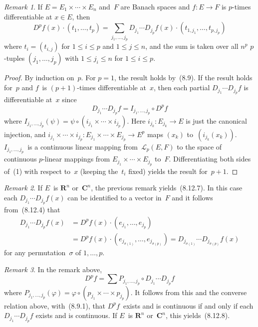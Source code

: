 \documentclass[letterpaper,12pt]{article}
\newcommand{\R}{\mathbf{R}}
\newcommand{\C}{\mathbf{C}}
\renewcommand{\L}{\mathcal{L}}
\newcommand{\after}{\circ}
\newcommand{\at}{\cdot}
\theoremstyle{plain}
\theoremstyle{definition}
\theoremstyle{remark}
\newtheorem*{rmk}{Remark}
\begin{document}
\begin{rmk}
If \(E=E_1\times\cdots\times E_n\) and~\(F\) are Banach spaces and \(f:E\to F\) is \(p\)-times differentiable at \(x\in E\), then
\[D^pf(x)\at(t_1,\ldots,t_p)=\sum_{j_1,\ldots,j_p}D_{j_1}\cdots D_{j_p}f(x)\at(t_{1,j_1},\ldots,t_{p,j_p})\tag{1}\]
where \(t_i=(t_{i,j})\) for \(1\le i\le p\) and \(1\le j\le n\), and the sum is taken over all \(n^p\) \(p\)-tuples \((j_1,\ldots,j_p)\) with \(1\le j_i\le n\) for \(1\le i\le p\).
\end{rmk}
\begin{proof}
By induction on~\(p\). For \(p=1\), the result holds by~(8.9). If the result holds for~\(p\) and \(f\)~is \((p+1)\)-times differentiable at~\(x\), then each partial \(D_{j_1}\cdots D_{j_p}f\) is differentiable at~\(x\) since
\[D_{j_1}\cdots D_{j_p}f=I_{j_1,\ldots,j_p}\after D^pf\]
where \(I_{j_1,\ldots,j_p}(\psi)=\psi\after(i_{j_1}\times\cdots\times i_{j_p})\). Here \(i_{j_k}:E_{j_k}\to E\) is just the canonical injection, and \(i_{j_1}\times\cdots\times i_{j_p}:E_{j_1}\times\cdots\times E_{j_p}\to E^p\) maps \((x_k)\) to~\((i_{j_k}(x_k))\). \(I_{j_1,\ldots,j_p}\)~is a continuous linear mapping from~\(\L_p(E,F)\) to the space of continuous \(p\)-linear mappings from \(E_{j_1}\times\cdots\times E_{j_p}\) to~\(F\). Differentiating both sides of~(1) with respect to~\(x\) (keeping the~\(t_i\) fixed) yields the result for~\(p+1\).
\end{proof}

\begin{rmk}
If \(E\)~is \(\R^n\) or~\(\C^n\), the previous remark yields~(8.12.7). In this case each \(D_{j_1}\cdots D_{j_p}f(x)\) can be identified to a vector in~\(F\) and it follows from~(8.12.4) that
\begin{align*}
D_{j_1}\cdots D_{j_p}f(x)&=D^pf(x)\at(e_{j_1},\ldots,e_{j_p})\\
	&=D^pf(x)\at(e_{j_{\sigma(1)}},\ldots,e_{j_{\sigma(p)}})=D_{j_{\sigma(1)}}\cdots D_{j_{\sigma(p)}}f(x)
\end{align*}
for any permutation~\(\sigma\) of \(1,\ldots,p\).
\end{rmk}

\begin{rmk}
In the remark above,
\[D^pf=\sum P_{j_1,\ldots,j_p}\after D_{j_1}\cdots D_{j_p}f\]
where \(P_{j_1,\ldots,j_p}(\varphi)=\varphi\after(p_{j_1}\times\cdots\times p_{j_p})\). It follows from this and the converse relation above, with~(8.9.1), that \(D^pf\)~exists and is continuous if and only if each \(D_{j_1}\cdots D_{j_p}f\) exists and is continuous. If \(E\)~is \(\R^n\) or~\(\C^n\), this yields~(8.12.8).
\end{rmk}
\end{document}
